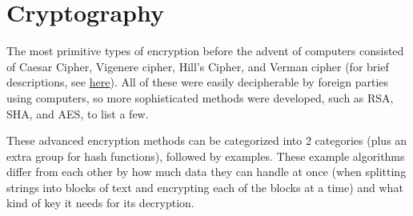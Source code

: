 \documentclass{article}
\begin{document}
\title{}
\author{Muchang Bahng}
\date{Fall 2024}

\maketitle
\tableofcontents
\pagebreak

\section{Cryptography}

    The most primitive types of encryption before the advent of computers consisted of Caesar Cipher, Vigenere cipher, Hill's Cipher, and Verman cipher (for brief descriptions, see \href{/PDF_Notes/Mathematics.pdf#page=447}{here}). All of these were easily decipherable by foreign parties using computers, so more sophisticated methods were developed, such as RSA, SHA, and AES, to list a few.

    These advanced encryption methods can be categorized into 2 categories (plus an extra group for hash functions), followed by examples. These example algorithms differ from each other by how much data they can handle at once (when splitting strings into blocks of text and encrypting each of the blocks at a time) and what kind of key it needs for its decryption.
\end{document}
